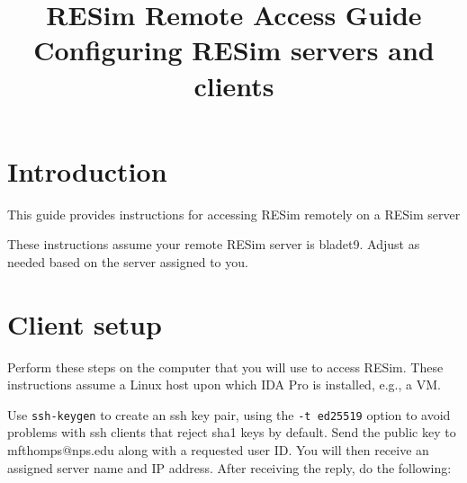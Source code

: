 \documentclass[titlepage]{article}
\begin{document}
\title {%
  RESim Remote Access Guide \\
  \large Configuring RESim servers and clients}
\maketitle
\section{Introduction}

This guide provides instructions for accessing RESim remotely on a RESim server

These instructions assume your remote RESim server is bladet9.  Adjust as needed based on the
server assigned to you.

\section{Client setup}
Perform these steps on the computer that you will use to access RESim.  These instructions
assume a Linux host upon which IDA Pro is installed, e.g., a VM.

Use {\tt ssh-keygen} to create an ssh key pair, using the {\tt -t ed25519} option to avoid problems with ssh
clients that reject sha1 keys by default. 
Send the public key to mfthomps@nps.edu along with a requested user ID. 
You will then receive an assigned server name and IP address.
After receiving the reply, do the following:
\end{document}
